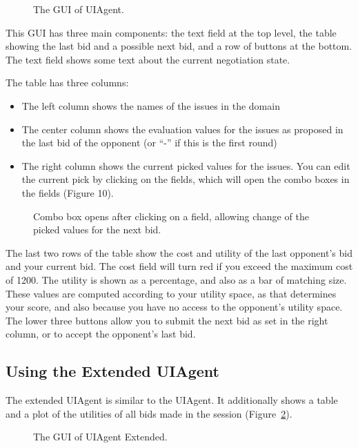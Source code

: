 \documentclass[]{article}
\begin{document}
\begin{figure}
\caption{The GUI of UIAgent.}\label{Fig:uiagent gui}
\end{figure}

This GUI has three main components: the text field at the top level, the table showing the last bid and a possible next bid, and a row of buttons at the bottom.
The text field shows some text about the current negotiation state.

The table has three columns: 
\begin{itemize}
	\item The left column shows the names of the issues in the domain
	\item The center column shows the evaluation values for the issues as proposed in the last bid of the opponent (or ``-'' if this is the first round)
	\item The right column shows the current picked values for the issues. You can edit the current pick by clicking on the fields, which will open the combo boxes in the fields (Figure 10).
\end{itemize}

\begin{figure}
\caption{Combo box opens after clicking on a field, allowing change of the picked values for the next bid.}
\end{figure}

The last two rows of the table show the cost and utility of the last opponent's bid and your current bid. The cost field will turn red if you exceed the maximum cost of 1200. The utility is shown as a percentage, and also as a bar of matching size. These values are computed according to your utility space, as that determines your score, and also because you have no access to the opponent's utility space. The lower three buttons allow you to submit the next bid as set in the right column, or to accept the opponent's last bid.

\subsection{Using the Extended UIAgent}

The extended UIAgent is similar to the UIAgent. It additionally shows a table and a plot of the utilities of all bids made in the session (Figure~\ref{Fig:uiagent extended gui}).

\begin{figure}
\caption{The GUI of UIAgent Extended.}\label{Fig:uiagent extended gui}
\end{figure}
\end{document}
